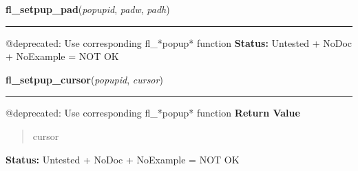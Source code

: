     \label{xformslib:deprecated:fl_setpup_pad}

    \vspace{0.5ex}

\hspace{.8\funcindent}\begin{boxedminipage}{\funcwidth}

    \raggedright \textbf{fl\_setpup\_pad}(\textit{popupid}, \textit{padw}, \textit{padh})

    \vspace{-1.5ex}

    \rule{\textwidth}{0.5\fboxrule}
\setlength{\parskip}{2ex}

@deprecated: Use corresponding fl\_*popup* function
\setlength{\parskip}{1ex}
\textbf{Status:} 
Untested + NoDoc + NoExample = NOT OK


    \end{boxedminipage}

    \label{xformslib:deprecated:fl_setpup_cursor}

    \vspace{0.5ex}

\hspace{.8\funcindent}\begin{boxedminipage}{\funcwidth}

    \raggedright \textbf{fl\_setpup\_cursor}(\textit{popupid}, \textit{cursor})

    \vspace{-1.5ex}

    \rule{\textwidth}{0.5\fboxrule}
\setlength{\parskip}{2ex}

@deprecated: Use corresponding fl\_*popup* function
\setlength{\parskip}{1ex}
      \textbf{Return Value}
    \vspace{-1ex}

      \begin{quote}

cursor
      \end{quote}

\textbf{Status:} 
Untested + NoDoc + NoExample = NOT OK


    \end{boxedminipage}

    \label{xformslib:deprecated:fl_setpup_maxpup}

